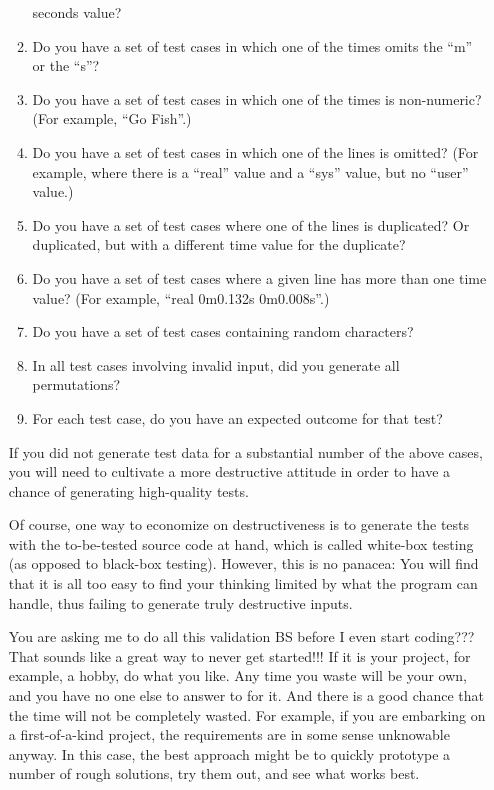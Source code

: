 \begin{enumerate}
\begin{enumerate}
		seconds value?
	\item	Do you have a set of test cases in which one of the
		times omits the ``m'' or the ``s''?
	\item	Do you have a set of test cases in which one of the
		times is non-numeric?  (For example, ``Go Fish''.)
	\item	Do you have a set of test cases in which one of the
		lines is omitted?  (For example, where there is a
		``real'' value and a ``sys'' value, but no ``user''
		value.)
	\item	Do you have a set of test cases where one of the
		lines is duplicated?  Or duplicated, but with a
		different time value for the duplicate?
	\item	Do you have a set of test cases where a given line
		has more than one time value?  (For example,
		``real 0m0.132s 0m0.008s''.)
	\item	Do you have a set of test cases containing random
		characters?
	\item	In all test cases involving invalid input, did you
		generate all permutations?
	\item	For each test case, do you have an expected outcome
		for that test?
	\end{enumerate}

	If you did not generate test data for a substantial number of
	the above cases, you will need to cultivate a more destructive
	attitude in order to have a chance of generating high-quality
	tests.

	Of course, one way to economize on destructiveness is to
	generate the tests with the to-be-tested source code at hand,
	which is called white-box testing (as opposed to black-box testing).
	However, this is no panacea: You will find that it is all too
	easy to find your thinking limited by what the program can handle,
	thus failing to generate truly destructive inputs.

\QuickQ{}
	You are asking me to do all this validation BS before
	I even start coding???
	That sounds like a great way to never get started!!!
\QuickA{}
	If it is your project, for example, a hobby, do what you like.
	Any time you waste will be your own, and you have no one else
	to answer to for it.
	And there is a good chance that the time will not be completely
	wasted.
	For example, if you are embarking on a first-of-a-kind project,
	the requirements are in some sense unknowable anyway.
	In this case, the best approach might be to quickly prototype
	a number of rough solutions, try them out, and see what works
	best.


\end{enumerate}
